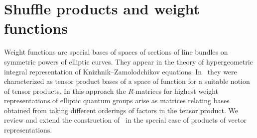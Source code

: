 \documentclass[10pt,a4paper]{amsart}
\numberwithin{equation}{section}
\begin{document}
\section{Shuffle products and weight functions}\label{s-3}
Weight functions are special bases of spaces of sections of line bundles on symmetric powers of elliptic curves. They appear in the theory of hypergeometric integral representation of Knizhnik--Zamolodchikov equations. In~\cite{FelderTarasovVarchenko1997} they were characterized as tensor product bases of a space of function for a suitable notion of tensor products. In this approach the $R$-matrices for highest weight representations of elliptic quantum groups arise as matrices relating bases obtained from taking different orderings of factors in the tensor product. We review and extend the construction of~\cite{FelderTarasovVarchenko1997} in the special case of products of vector representations.
\end{document}
